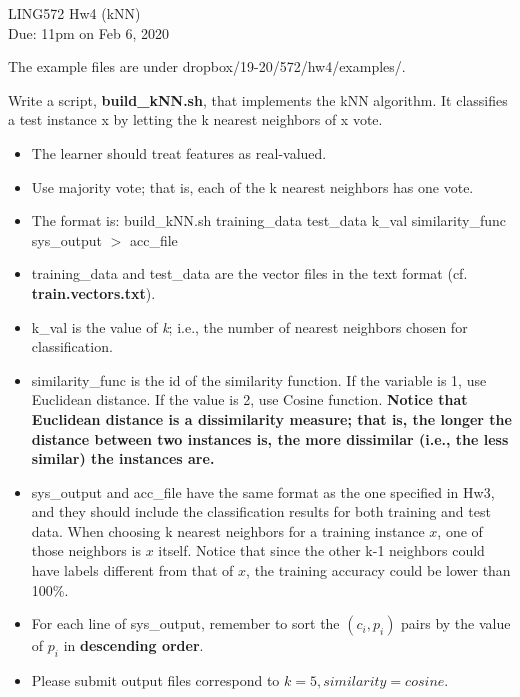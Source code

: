 \documentclass[11pt]{article}
\begin{document}
\begin{center}
\LARGE
LING572 Hw4 (kNN)\\
Due: 11pm on Feb 6, 2020\\



\vspace{0.3in}
\end{center}


The example files are under dropbox/19-20/572/hw4/examples/.



\vspace{0.3 in}
 Write a script, {\bf build\_kNN.sh}, 
that implements the kNN algorithm. It classifies a test instance x 
by letting the k nearest neighbors of x vote. 
\begin{itemize} 
  \item The learner should treat features as real-valued.

  \item Use majority vote; that is, each of the k nearest neighbors
         has one vote.

  \item The format is: build\_kNN.sh training\_data test\_data k\_val similarity\_func sys\_output $>$ acc\_file 

  \item training\_data and test\_data are the vector files in the text format
        (cf. {\bf train.vectors.txt}).

  \item k\_val is the value of {\it k}; i.e., 
        the number of nearest neighbors chosen for classification.
  
  \item similarity\_func is the id of the similarity function. 
        If the variable is 1, use Euclidean distance. If the value is 2,
          use Cosine function. {\bf Notice that Euclidean distance is a 
          dissimilarity measure; that is, the longer the distance 
          between two instances is,
          the more dissimilar (i.e., the less similar) the instances are.}

  \item sys\_output and acc\_file have the same format as the one 
    specified in Hw3, and they should include the classification results
    for both training and test data. When choosing k nearest neighbors
    for a training instance $x$, one of those neighbors is $x$ itself.
    Notice that since the other k-1 neighbors could have labels different from
    that of $x$, the training accuracy could be lower than 100\%.

  \item For each line of sys\_output, remember to sort
      the $(c_i, p_i)$ pairs by the value
      of $p_i$ in {\bf descending order}.

  \item Please submit output files correspond to $k=5, similarity=cosine$.
\end{itemize}
\end{document}

